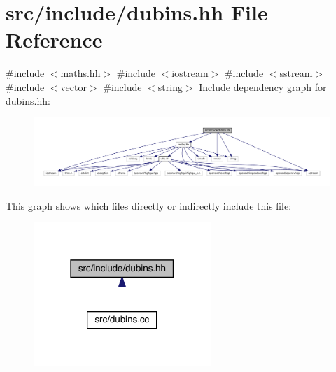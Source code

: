 \hypertarget{dubins_8hh}{}\section{src/include/dubins.hh File Reference}
\label{dubins_8hh}
{\ttfamily \#include $<$maths.\+hh$>$}\newline
{\ttfamily \#include $<$iostream$>$}\newline
{\ttfamily \#include $<$sstream$>$}\newline
{\ttfamily \#include $<$vector$>$}\newline
{\ttfamily \#include $<$string$>$}\newline
Include dependency graph for dubins.\+hh\+:
\nopagebreak
\begin{figure}[H]
\begin{center}
\leavevmode
\includegraphics[width=350pt]{dubins_8hh__incl}
\end{center}
\end{figure}
This graph shows which files directly or indirectly include this file\+:
\nopagebreak
\begin{figure}[H]
\begin{center}
\leavevmode
\includegraphics[width=190pt]{dubins_8hh__dep__incl}
\end{center}
\end{figure}
